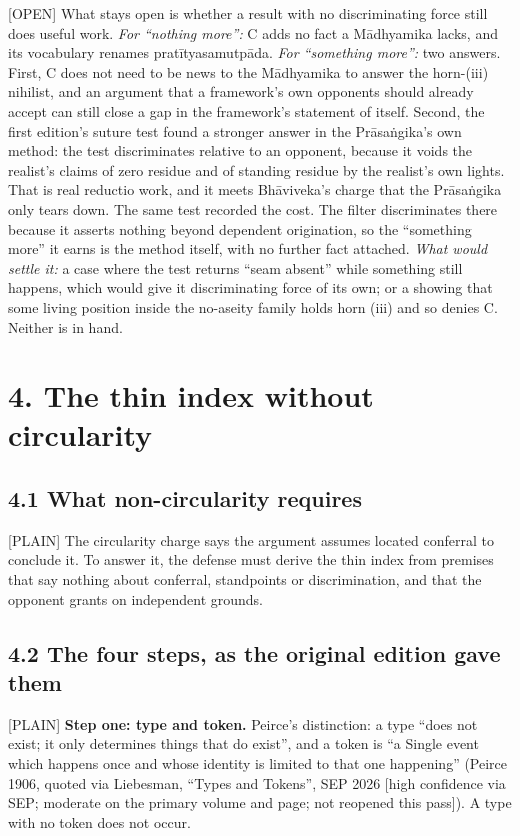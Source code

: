 \documentclass[11pt]{article}
\newcommand{\register}[1]{{\ttfamily\small #1}}
\begin{document}
\register{[OPEN]} What stays open is whether a result with no discriminating force still does useful work. \emph{For ``nothing more'':} C adds no fact a Mādhyamika lacks, and its vocabulary renames pratītyasamutpāda. \emph{For ``something more'':} two answers. First, C does not need to be news to the Mādhyamika to answer the horn-(iii) nihilist, and an argument that a framework's own opponents should already accept can still close a gap in the framework's statement of itself. Second, the first edition's suture test found a stronger answer in the Prāsaṅgika's own method: the test discriminates relative to an opponent, because it voids the realist's claims of zero residue and of standing residue by the realist's own lights. That is real reductio work, and it meets Bhāviveka's charge that the Prāsaṅgika only tears down. The same test recorded the cost. The filter discriminates there because it asserts nothing beyond dependent origination, so the ``something more'' it earns is the method itself, with no further fact attached. \emph{What would settle it:} a case where the test returns ``seam absent'' while something still happens, which would give it discriminating force of its own; or a showing that some living position inside the no-aseity family holds horn (iii) and so denies C. Neither is in hand.

\section*{4. The thin index without circularity}

\subsection*{4.1 What non-circularity requires}

\register{[PLAIN]} The circularity charge says the argument assumes located conferral to conclude it. To answer it, the defense must derive the thin index from premises that say nothing about conferral, standpoints or discrimination, and that the opponent grants on independent grounds.

\subsection*{4.2 The four steps, as the original edition gave them}

\register{[PLAIN]} \textbf{Step one: type and token.} Peirce's distinction: a type ``does not exist; it only determines things that do exist'', and a token is ``a Single event which happens once and whose identity is limited to that one happening'' (Peirce 1906, quoted via Liebesman, ``Types and Tokens'', SEP 2026 [high confidence via SEP; moderate on the primary volume and page; not reopened this pass]). A type with no token does not occur.
\end{document}
